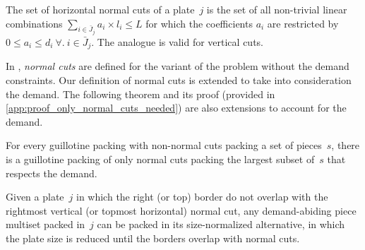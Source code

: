 \documentclass[runningheads]{llncs}
\begin{document}

\begin{definition}
The set of horizontal normal cuts of a plate~\(j\) is the set of all non-trivial linear combinations \(\sum_{i \in \bar{J}_j} a_i \times l_i \leq L\) for which the coefficients \(a_i\) are restricted by \(0 \leq a_i \leq d_i~\forall.~i \in \bar{J}_j\). The analogue is valid for vertical cuts.
\end{definition}

In \cite{nicos:1977}, \emph{normal cuts} are defined for the variant of the problem without the demand constraints.
Our definition of normal cuts is extended to take into consideration the demand.
The following theorem and its proof (provided in \autoref{app:proof_only_normal_cuts_needed}) are also extensions to account for the demand.

\begin{theorem}\label{only_normal_cuts_needed}
For every guillotine packing with non-normal cuts packing a set of pieces~\(s\), there is a guillotine packing of only normal cuts packing the largest subset of~\(s\) that respects the demand.
\end{theorem}


\begin{corollary}\label{co:size_normalized_plate}
Given a plate~\(j\) in which the right (or top) border do not overlap with the rightmost vertical (or topmost horizontal) normal cut, any demand-abiding piece multiset packed in~\(j\) can be packed in its size-normalized alternative, in which the plate size is reduced until the borders overlap with normal cuts.
\end{corollary}
\end{document}

